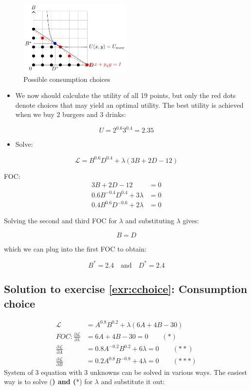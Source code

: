 \documentclass[
  12pt,
  oneside]{book}
\providecommand{\tightlist}{%
  \setlength{\itemsep}{0pt}\setlength{\parskip}{0pt}}
\theoremstyle{definition}
\theoremstyle{definition}
\theoremstyle{definition}
\theoremstyle{definition}
\theoremstyle{remark}
\begin{document}
\begin{figure}
\centering
\includegraphics[width=0.5\textwidth,height=\textheight]{fig/burgerutility.png}
\caption{\label{fig:burgerutility2} Possible consumption choices}
\end{figure}

\begin{itemize}
\tightlist
\item
  We now should calculate the utility of all 19 points, but only the red dots denote choices that may yield an optimal utility. The best utility is achieved when we buy 2 burgers and 3 drinks:
\end{itemize}

\[U=2^{0.6}3^{0.4}=2.35\]

\begin{itemize}
\tightlist
\item
  Solve:
\end{itemize}

\[
\mathcal{L}=B^{0.6}D^{0.4}+\lambda(3B+2D-12)
\]

FOC:
\begin{align*}
3B+2D-12&=0\\
0.6B^{-0.4}D^{0.4}+3\lambda&=0\\
0.4B^{0.6}D^{-0.6}+2\lambda&=0
\end{align*}

Solving the second and third FOC for \(\lambda\) and substituting \(\lambda\) gives:

\[B=D\]

which we can plug into the first FOC to obtain:

\[B^*=2.4 \quad \text{and} \quad D^*=2.4\]

\subsection*{Solution to exercise \ref{exr:cchoice}: Consumption choice}\label{sol:cchoice}

\begin{align*}
\mathcal{L}&=A^{0.8}B^{0.2}+\lambda(6A+4B-30)\\
FOC: \frac{\partial \mathcal{L}}{\partial \lambda}&=6A+4B-30=0 \qquad (*)\\
\frac{\partial \mathcal{L}}{\partial A}&=0.8A^{-0.2}B^{0.2}+6\lambda=0 \qquad (**)\\
\frac{\partial \mathcal{L}}{\partial B}&=0.2A^{0.8}B^{-0.8}+4\lambda=0 \qquad (***)
\end{align*}
System of 3 equation with 3 unknowns can be solved in various ways.
The easiest way is to solve (\textbf{) and (}*) for \(\lambda\) and substitute it out:
\end{document}
